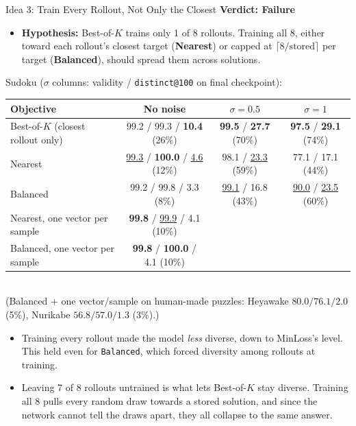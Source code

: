 \documentclass[aspectratio=169,10pt]{beamer}
\newcommand{\secbest}[1]{\underline{#1}}
\newcommand{\verdictfail}{\textcolor{accentred}{\textbf{Verdict: Failure}}}
\newcommand{\Bok}{Best-of-$K$}
\begin{document}

\begin{frame}{Idea 3: Train Every Rollout, Not Only the Closest}
  \verdictfail

  \vspace{0.15em}
  \footnotesize
  \begin{itemize}\setlength{\itemsep}{0.2em}
    \item \textbf{Hypothesis:} \Bok{} trains only 1 of 8 rollouts. Training all 8, either toward each rollout's closest target (\textbf{Nearest}) or capped at $\lceil 8/\text{stored}\rceil$ per target (\textbf{Balanced}), should spread them across solutions.
  \end{itemize}

  \vspace{0.2em}
  \centering
  \scriptsize
  Sudoku ($\sigma$ columns: validity / \texttt{distinct@100} on final checkpoint):\\[0.15em]
  \begin{tabular}{@{}lccc@{}}
    \toprule
    \textbf{Objective} & \textbf{No noise} & \textbf{$\sigma = 0.5$} & \textbf{$\sigma = 1$} \\
    \midrule
    \Bok{} (closest rollout only) & 99.2 / 99.3 / \textbf{10.4} (26\%) & \textbf{99.5} / \textbf{27.7} (70\%) & \textbf{97.5} / \textbf{29.1} (74\%) \\
    Nearest & \secbest{99.3} / \textbf{100.0} / \secbest{4.6} (12\%) & 98.1 / \secbest{23.3} (59\%) & 77.1 / 17.1 (44\%) \\
    Balanced & 99.2 / 99.8 / 3.3 (8\%) & \secbest{99.1} / 16.8 (43\%) & \secbest{90.0} / \secbest{23.5} (60\%) \\
    Nearest, one vector per sample & \textbf{99.8} / \secbest{99.9} / 4.1 (10\%) & & \\
    Balanced, one vector per sample & \textbf{99.8} / \textbf{100.0} / 4.1 (10\%) & & \\
    \bottomrule
  \end{tabular}
  \\[0.2em]
  {\scriptsize (Balanced + one vector/sample on human-made puzzles: Heyawake $80.0 / 76.1 / 2.0$ (5\%), Nurikabe $56.8 / 57.0 / 1.3$ (3\%).)}

  \vspace{0.25em}
  \raggedright\footnotesize
\begin{itemize}\setlength{\itemsep}{0.3em}
    \item Training every rollout made the model \emph{less} diverse, down to MinLoss's level. This held even for \texttt{Balanced}, which forced diversity among rollouts at training.
    \item Leaving 7 of 8 rollouts untrained is what lets \Bok{} stay diverse. Training all 8 pulls every random draw towards a stored solution, and since the network cannot tell the draws apart, they all collapse to the same answer.
  \end{itemize}
\end{frame}
\end{document}
